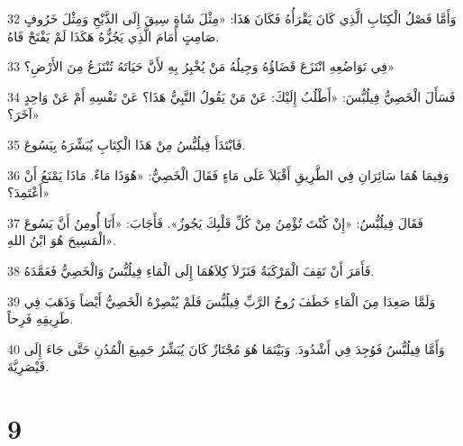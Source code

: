 \par 32 وَأَمَّا فَصْلُ الْكِتَابِ الَّذِي كَانَ يَقْرَأُهُ فَكَانَ هَذَا: «مِثْلَ شَاةٍ سِيقَ إِلَى الذَّبْحِ وَمِثْلَ خَرُوفٍ صَامِتٍ أَمَامَ الَّذِي يَجُزُّهُ هَكَذَا لَمْ يَفْتَحْ فَاهُ.
\par 33 فِي تَوَاضُعِهِ انْتَزَعَ قَضَاؤُهُ وَجِيلُهُ مَنْ يُخْبِرُ بِهِ لأَنَّ حَيَاتَهُ تُنْتَزَعُ مِنَ الأَرْضِ؟»
\par 34 فَسَأَلَ الْخَصِيُّ فِيلُبُّسَ: «أَطْلُبُ إِلَيْكَ: عَنْ مَنْ يَقُولُ النَّبِيُّ هَذَا؟ عَنْ نَفْسِهِ أَمْ عَنْ وَاحِدٍ آخَرَ؟»
\par 35 فَابْتَدَأَ فِيلُبُّسُ مِنْ هَذَا الْكِتَابِ يُبَشِّرَهُ بِيَسُوعَ.
\par 36 وَفِيمَا هُمَا سَائِرَانِ فِي الطَّرِيقِ أَقْبَلاَ عَلَى مَاءٍ فَقَالَ الْخَصِيُّ: «هُوَذَا مَاءٌ. مَاذَا يَمْنَعُ أَنْ أَعْتَمِدَ؟»
\par 37 فَقَالَ فِيلُبُّسُ: «إِنْ كُنْتَ تُؤْمِنُ مِنْ كُلِّ قَلْبِكَ يَجُوزُ». فَأَجَابَ: «أَنَا أُومِنُ أَنَّ يَسُوعَ الْمَسِيحَ هُوَ ابْنُ اللهِ».
\par 38 فَأَمَرَ أَنْ تَقِفَ الْمَرْكَبَةُ فَنَزَلاَ كِلاَهُمَا إِلَى الْمَاءِ فِيلُبُّسُ وَالْخَصِيُّ فَعَمَّدَهُ.
\par 39 وَلَمَّا صَعِدَا مِنَ الْمَاءِ خَطَفَ رُوحُ الرَّبِّ فِيلُبُّسَ فَلَمْ يُبْصِرْهُ الْخَصِيُّ أَيْضاً وَذَهَبَ فِي طَرِيقِهِ فَرِحاً.
\par 40 وَأَمَّا فِيلُبُّسُ فَوُجِدَ فِي أَشْدُودَ. وَبَيْنَمَا هُوَ مُجْتَازٌ كَانَ يُبَشِّرُ جَمِيعَ الْمُدُنِ حَتَّى جَاءَ إِلَى قَيْصَرِيَّةَ.

\chapter{9}

